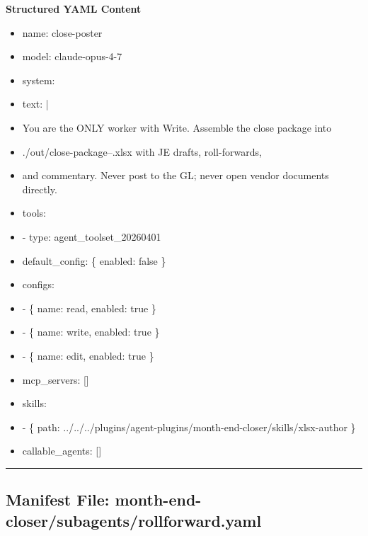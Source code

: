 \documentclass[11pt]{article}
\begin{document}
\textbf{Structured YAML Content}
\begin{itemize}[leftmargin=*,itemsep=2pt,topsep=2pt]
\item {} name: close-poster
\item {} model: claude-opus-4-7
\item {} system:
\item {} text: |
\item {} You are the ONLY worker with Write. Assemble the close package into
\item {} ./out/close-package--.xlsx with JE drafts, roll-forwards,
\item {} and commentary. Never post to the GL; never open vendor documents directly.
\item {} tools:
\item {} - type: agent\_\allowbreak{}toolset\_\allowbreak{}20260401
\item {} default\_\allowbreak{}config: \{ enabled: false \}
\item {} configs:
\item {} - \{ name: read, enabled: true \}
\item {} - \{ name: write, enabled: true \}
\item {} - \{ name: edit, enabled: true \}
\item {} mcp\_\allowbreak{}servers: []
\item {} skills:
\item {} - \{ path: ../../../plugins/agent-plugins/month-end-closer/skills/xlsx-author \}
\item {} callable\_\allowbreak{}agents: []
\end{itemize}

\vspace{0.8em}\hrule\vspace{0.8em}

\subsection{Manifest File: month-end-closer/subagents/rollforward.yaml}\label{file:month-end-closer-subagents-rollforward-yaml}
\end{document}
